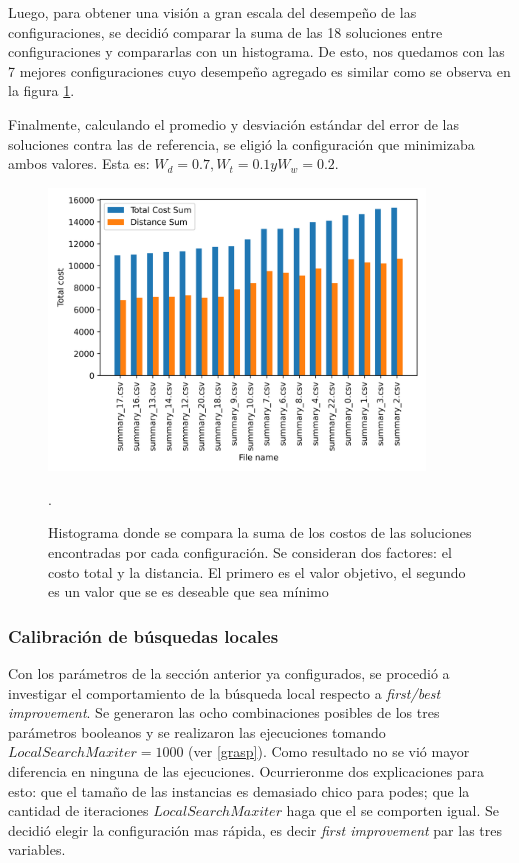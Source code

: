 \documentclass{article}
\begin{document}
  Luego, para obtener una visión a gran escala del desempeño de las configuraciones, se decidió comparar la suma de las 18 soluciones entre configuraciones y compararlas con un histograma. De esto, nos quedamos con las 7 mejores configuraciones cuyo desempeño agregado es similar como se observa en la figura \ref{cmphistogram}.

  Finalmente, calculando el promedio y desviación estándar del error de las soluciones contra las de referencia, se eligió la configuración que minimizaba ambos valores. Esta es: $W_d = 0.7, W_t = 0.1 y W_w = 0.2$.

  \begin{figure}
    \centering
    \includegraphics[width=10cm]{resources/tunning/total_cost_histogram_used.png}
    \caption{Histograma donde se compara la suma de los costos de las soluciones encontradas por cada configuración. Se consideran dos factores: el costo total y la distancia. El primero es el valor objetivo, el segundo es un valor que se es deseable que sea mínimo}.
    \label{cmphistogram}
  \end{figure}

  \subsubsection*{Calibración de búsquedas locales}

  Con los parámetros de la sección anterior ya configurados, se procedió a investigar el comportamiento de la búsqueda local respecto a {\it first/best improvement}. Se generaron las ocho combinaciones posibles de los tres parámetros booleanos y se realizaron las ejecuciones tomando $LocalSearchMaxiter = 1000$ (ver \ref{grasp}). Como resultado no se vió mayor diferencia en ninguna de las ejecuciones. Ocurrieronme dos explicaciones para esto: que el tamaño de las instancias es demasiado chico para podes; que la cantidad de iteraciones $LocalSearchMaxiter$ haga que el se comporten igual. Se decidió elegir la configuración mas rápida, es decir {\it first improvement} par las tres variables.
\end{document}
